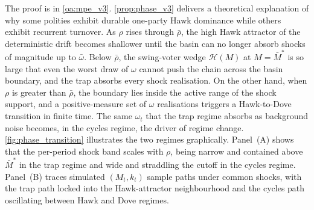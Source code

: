 \documentclass[11pt,twoside]{extarticle}
\begin{document}
The proof is in \autoref{oa:mpe_v3}.
\autoref{prop:phase_v3} delivers a theoretical explanation of why some polities exhibit durable one-party Hawk dominance while others exhibit recurrent turnover. As $\rho$ rises through $\bar\rho$, the high Hawk attractor of the deterministic drift becomes shallower until the basin can no longer absorb shocks of magnitude up to $\bar\omega$. 
Below $\bar\rho$, the swing-voter wedge $\mathcal H(M)$ at $M=\bar M^*$ is so large that even the worst draw of $\omega$ cannot push the chain across the basin boundary, and the trap absorbs every shock realisation. 
On the other hand, when $\rho$ is greater than $\bar\rho$, the boundary lies inside the active range of the shock support, and a positive-measure set of $\omega$ realisations triggers a Hawk-to-Dove transition in finite time. 
The same $\omega_t$ that the trap regime absorbs as background noise becomes, in the cycles regime, the driver of regime change. \autoref{fig:phase_transition} illustrates the two regimes graphically. 
Panel~(A) shows that the per-period shock band scales with $\rho$, being narrow and contained above $\bar M^*$ in the trap regime and wide and straddling the cutoff in the cycles regime. Panel~(B) traces simulated $(M_t,k_t)$ sample paths under common shocks, with the trap path locked into the Hawk-attractor neighbourhood and the cycles path oscillating between Hawk and Dove regimes.
\end{document}
